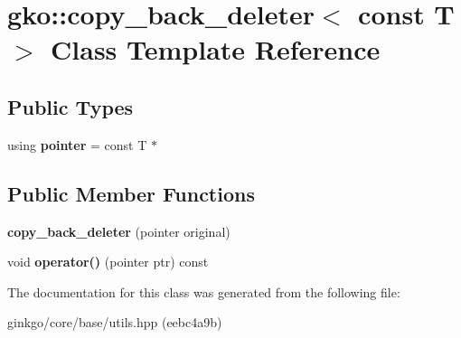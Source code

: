 \hypertarget{classgko_1_1copy__back__deleter_3_01const_01T_01_4}{}\section{gko\+:\+:copy\+\_\+back\+\_\+deleter$<$ const T $>$ Class Template Reference}
\label{classgko_1_1copy__back__deleter_3_01const_01T_01_4}
\subsection*{Public Types}
\begin{DoxyCompactItemize}
\item 
\mbox{\label{classgko_1_1copy__back__deleter_3_01const_01T_01_4_ac97aced5ec2b913d1b2ed864852c7e7a}} 
using {\bfseries pointer} = const T $\ast$
\end{DoxyCompactItemize}
\subsection*{Public Member Functions}
\begin{DoxyCompactItemize}
\item 
\mbox{\label{classgko_1_1copy__back__deleter_3_01const_01T_01_4_a5df23aa81eb300213916238b9bf93507}} 
{\bfseries copy\+\_\+back\+\_\+deleter} (pointer original)
\item 
\mbox{\label{classgko_1_1copy__back__deleter_3_01const_01T_01_4_a040c2d22121f60c491e3b6e65f399248}} 
void {\bfseries operator()} (pointer ptr) const
\end{DoxyCompactItemize}


The documentation for this class was generated from the following file\+:\begin{DoxyCompactItemize}
\item 
ginkgo/core/base/utils.\+hpp (eebc4a9b)\end{DoxyCompactItemize}
